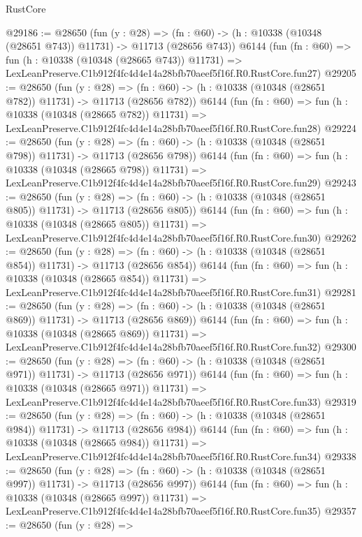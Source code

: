 \begin{lexlean}{RustCore}
\begin{coremodule}
@29186 := @28650
    (fun (y : @28) =>
    (fn : @60) -> (h : @10338 (@10348 (@28651 @743)) @11731) -> @11713 (@28656 @743))
    @6144
    (fun (fn : @60) =>
    fun (h : @10338 (@10348 (@28665 @743)) @11731) =>
    LexLeanPreserve.C1b912f4fc4d4e14a28bfb70aeef5f16f.R0.RustCore.fun27)
@29205 := @28650
    (fun (y : @28) =>
    (fn : @60) -> (h : @10338 (@10348 (@28651 @782)) @11731) -> @11713 (@28656 @782))
    @6144
    (fun (fn : @60) =>
    fun (h : @10338 (@10348 (@28665 @782)) @11731) =>
    LexLeanPreserve.C1b912f4fc4d4e14a28bfb70aeef5f16f.R0.RustCore.fun28)
@29224 := @28650
    (fun (y : @28) =>
    (fn : @60) -> (h : @10338 (@10348 (@28651 @798)) @11731) -> @11713 (@28656 @798))
    @6144
    (fun (fn : @60) =>
    fun (h : @10338 (@10348 (@28665 @798)) @11731) =>
    LexLeanPreserve.C1b912f4fc4d4e14a28bfb70aeef5f16f.R0.RustCore.fun29)
@29243 := @28650
    (fun (y : @28) =>
    (fn : @60) -> (h : @10338 (@10348 (@28651 @805)) @11731) -> @11713 (@28656 @805))
    @6144
    (fun (fn : @60) =>
    fun (h : @10338 (@10348 (@28665 @805)) @11731) =>
    LexLeanPreserve.C1b912f4fc4d4e14a28bfb70aeef5f16f.R0.RustCore.fun30)
@29262 := @28650
    (fun (y : @28) =>
    (fn : @60) -> (h : @10338 (@10348 (@28651 @854)) @11731) -> @11713 (@28656 @854))
    @6144
    (fun (fn : @60) =>
    fun (h : @10338 (@10348 (@28665 @854)) @11731) =>
    LexLeanPreserve.C1b912f4fc4d4e14a28bfb70aeef5f16f.R0.RustCore.fun31)
@29281 := @28650
    (fun (y : @28) =>
    (fn : @60) -> (h : @10338 (@10348 (@28651 @869)) @11731) -> @11713 (@28656 @869))
    @6144
    (fun (fn : @60) =>
    fun (h : @10338 (@10348 (@28665 @869)) @11731) =>
    LexLeanPreserve.C1b912f4fc4d4e14a28bfb70aeef5f16f.R0.RustCore.fun32)
@29300 := @28650
    (fun (y : @28) =>
    (fn : @60) -> (h : @10338 (@10348 (@28651 @971)) @11731) -> @11713 (@28656 @971))
    @6144
    (fun (fn : @60) =>
    fun (h : @10338 (@10348 (@28665 @971)) @11731) =>
    LexLeanPreserve.C1b912f4fc4d4e14a28bfb70aeef5f16f.R0.RustCore.fun33)
@29319 := @28650
    (fun (y : @28) =>
    (fn : @60) -> (h : @10338 (@10348 (@28651 @984)) @11731) -> @11713 (@28656 @984))
    @6144
    (fun (fn : @60) =>
    fun (h : @10338 (@10348 (@28665 @984)) @11731) =>
    LexLeanPreserve.C1b912f4fc4d4e14a28bfb70aeef5f16f.R0.RustCore.fun34)
@29338 := @28650
    (fun (y : @28) =>
    (fn : @60) -> (h : @10338 (@10348 (@28651 @997)) @11731) -> @11713 (@28656 @997))
    @6144
    (fun (fn : @60) =>
    fun (h : @10338 (@10348 (@28665 @997)) @11731) =>
    LexLeanPreserve.C1b912f4fc4d4e14a28bfb70aeef5f16f.R0.RustCore.fun35)
@29357 := @28650
    (fun (y : @28) =>

\end{coremodule}
\end{lexlean}
